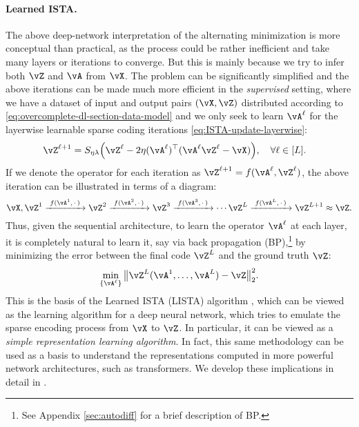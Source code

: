 \documentclass[../../book-main.tex]{subfiles}
\begin{document}
\paragraph{Learned ISTA.} The above deep-network  interpretation of the
alternating minimization is more conceptual than practical, as the process could
be rather inefficient and take many layers or iterations to converge. 
But this
is mainly because we try to infer both \(\vZ\) and \(\vA\) from \(\vX\). 
The problem can be significantly simplified and the above iterations can be made
much more efficient in the \textit{supervised} setting, where we have a dataset of input
and output pairs \((\vX, \vZ)\) distributed according to
\eqref{eq:overcomplete-dl-section-data-model} and we only seek to learn
\(\vA^\ell\) for the layerwise learnable sparse coding iterations
\eqref{eq:ISTA-update-layerwise}:
\begin{align}
    & \vZ^{\ell + 1} = S_{\eta\lambda}\rp{\vZ^{\ell} - 2\eta(\vA^{\ell})^{\top}(\vA^\ell\vZ^{\ell} - \vX)}, \quad \forall \ell \in [L].
\end{align}
If we denote the operator for each iteration as $\vZ^{\ell + 1} = f(\vA^\ell, \vZ^\ell)$, the above iteration can be illustrated in terms of a diagram:
\begin{equation*}
\vX, \vZ^1 \xrightarrow{\hspace{1mm} f(\vA^1,\,\cdot\,) \hspace{1mm}}  \vZ^2 \xrightarrow{\hspace{1mm} f(\vA^2,\,\cdot\,) \hspace{1mm}}  \vZ^3  \xrightarrow{\hspace{1mm} f(\vA^3,\,\cdot\,) \hspace{1mm}} \cdots \vZ^{L}  \xrightarrow{\hspace{1mm} f(\vA^{L},\,\cdot\,) \hspace{1mm}} \vZ^{L + 1} \approx \vZ.  
\label{eqn:deep-sparse-encoding}
\end{equation*}
Thus, given the sequential architecture, to learn the operator \(\vA^\ell\) at
each layer, it is completely natural to learn it, say via back propagation
(BP),\footnote{See Appendix \ref{sec:autodiff} for a brief description of BP.} by minimizing the error between the final code $\vZ^L$ and the ground truth $\vZ$:
\begin{equation}\label{eq:lista-training}
    \min_{\{\vA^\ell\}} \big\|\vZ^L(\vA^1, \ldots, \vA^{L}) - \vZ\big\|_2^2.
\end{equation}
This is the basis of the Learned ISTA (LISTA) algorithm \cite{gregor2010learning}, which can be viewed as the learning algorithm for a deep  neural network, which tries to emulate the sparse encoding process from $\vX$ to $\vZ$. In particular, it can be viewed as a \textit{simple representation learning algorithm}. 
In fact, this same methodology can be used as a basis to understand the
representations computed in more powerful network architectures, such as
transformers. We develop these implications in detail in .
\end{document}
